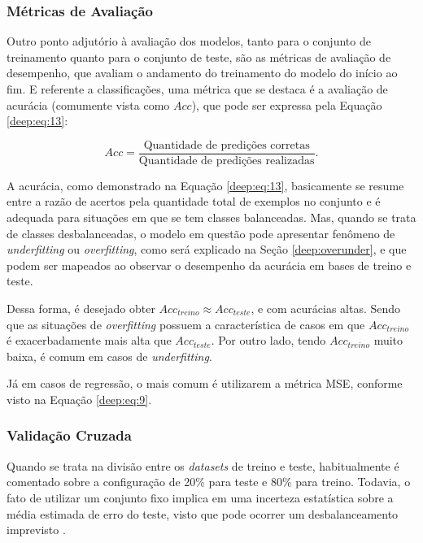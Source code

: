 \subsubsection{Métricas de Avaliação}
\label{deep:metrics}

Outro ponto adjutório à avaliação dos modelos, tanto para o conjunto de treinamento quanto para o conjunto de teste, são as métricas de avaliação de desempenho, que avaliam o andamento do treinamento do modelo do início ao fim. E referente a classificações, uma métrica que se destaca é a avaliação de acurácia (comumente vista como $Acc$), que pode ser expressa pela Equação \ref{deep:eq:13}:

\begin{equation}
    \label{deep:eq:13}
    Acc = \frac{\text{Quantidade de predições corretas}}{\text{Quantidade de predições realizadas}}.
\end{equation}

A acurácia, como demonstrado na Equação \ref{deep:eq:13}, basicamente se resume entre a razão de acertos pela quantidade total de exemplos no conjunto e é adequada para situações em que se tem classes balanceadas. Mas, quando se trata de classes desbalanceadas, o modelo em questão pode apresentar fenômeno de \textit{underfitting} ou \textit{overfitting}, como será explicado na Seção \ref{deep:overunder}, e que podem ser mapeados ao observar o desempenho da acurácia em bases de treino e teste.

Dessa forma, é desejado obter $Acc_{treino} \approx Acc_{teste}$, e com  acurácias altas. Sendo que as situações de \textit{overfitting} possuem a característica de casos em que $Acc_{treino}$ é exacerbadamente mais alta que $Acc_{teste}$. Por outro lado, tendo $Acc_{treino}$ muito baixa, é comum em casos de \textit{underfitting}.

Já em casos de regressão, o mais comum é utilizarem a métrica MSE, conforme visto na Equação \ref{deep:eq:9}.


\subsubsection{Validação Cruzada}
\label{deep:cross}

Quando se trata na divisão entre os \textit{datasets} de treino e teste, habitualmente é comentado sobre a configuração de 20\% para teste e 80\% para treino. Todavia, o fato de utilizar um conjunto fixo implica em uma incerteza estatística sobre a média estimada de erro do teste, visto que pode ocorrer um desbalanceamento imprevisto \citep{Goodfellow2016}.

